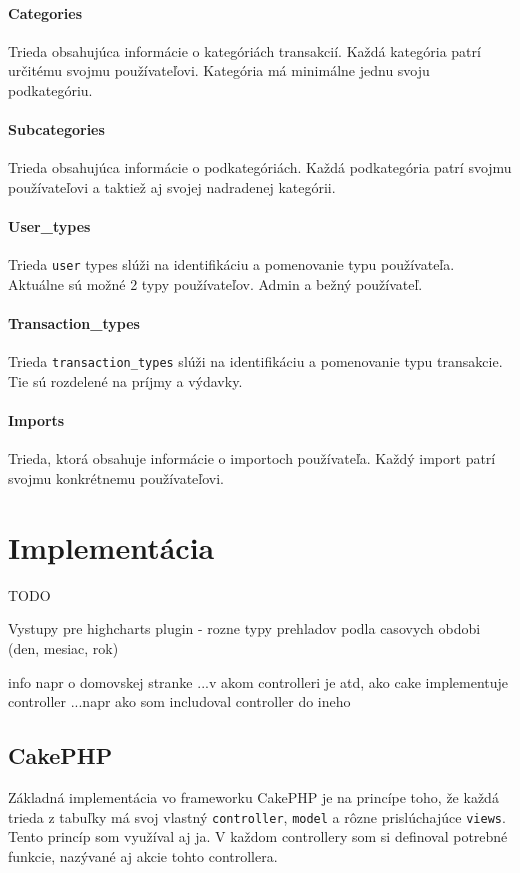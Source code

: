 \documentclass[12pt,oneside]{book}
\begin{document}
\subsubsection{Categories}
Trieda obsahujúca informácie o kategóriách transakcií. Každá kategória patrí určitému svojmu používateľovi. Kategória má minimálne jednu svoju podkategóriu.
\subsubsection{Subcategories}
Trieda obsahujúca informácie o podkategóriách. Každá podkategória patrí svojmu používateľovi a taktiež aj svojej nadradenej kategórii.
\subsubsection{User\_types}
Trieda \texttt{user} types slúži na identifikáciu a pomenovanie typu používateľa. Aktuálne sú možné 2 typy používateľov. Admin a bežný používateľ.
\subsubsection{Transaction\_types}
Trieda \texttt{transaction\_types} slúži na identifikáciu a pomenovanie typu transakcie. Tie sú rozdelené na príjmy a výdavky.
\subsubsection{Imports}
Trieda, ktorá obsahuje informácie o importoch používateľa. Každý import patrí svojmu konkrétnemu používateľovi.



\chapter{Implementácia}

TODO

Vystupy pre highcharts plugin - rozne typy prehladov podla casovych obdobi (den, mesiac, rok)

info napr o domovskej stranke ...v akom controlleri je atd, ako cake implementuje controller ...napr ako som includoval controller do ineho

\section{CakePHP}
Základná implementácia vo frameworku CakePHP je na princípe toho, že každá trieda z tabuľky má svoj vlastný \texttt{controller}, \texttt{model} a rôzne prislúchajúce \texttt{views}. Tento princíp som využíval aj ja. V každom controllery som si definoval potrebné funkcie, nazývané aj akcie tohto controllera. 
\end{document}

